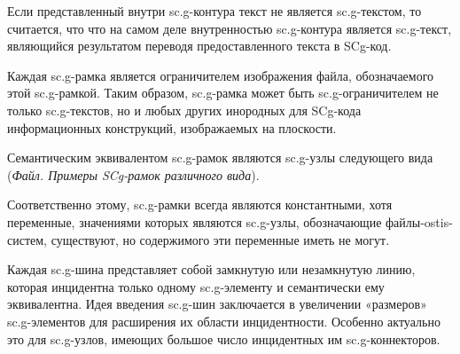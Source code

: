 \begin{SCn}
{Если представленный внутри sc.g-контура текст не является sc.g-текстом, то считается, что что на самом деле внутренностью sc.g-контура является sc.g-текст, являющийся результатом переводя предоставленного текста в SCg-код.

Каждая sc.g-рамка является ограничителем изображения файла, обозначаемого этой sc.g-рамкой. Таким образом, sc.g-рамка может быть sc.g-ограничителем не только sc.g-текстов, но и любых других инородных для SCg-кода информационных конструкций, изображаемых на плоскости.

Семантическим эквивалентом sc.g-рамок являются sc.g-узлы следующего вида (\textit{Файл. Примеры SCg-рамок различного вида}).

Соответственно этому, sc.g-рамки всегда являются константными, хотя переменные, значениями которых являются sc.g-узлы, обозначающие файлы-ostis-систем, существуют, но  содержимого эти переменные иметь не могут.

Каждая sc.g-шина представляет собой замкнутую или незамкнутую линию, которая инцидентна только одному sc.g-элементу и семантически ему эквивалентна. Идея введения sc.g-шин заключается в увеличении «размеров» sc.g-элементов для расширения их области инцидентности. Особенно актуально это для sc.g-узлов, имеющих большое число инцидентных им sc.g-коннекторов.}


\scnendstruct


\scnstartsubstruct

\end{SCn}
